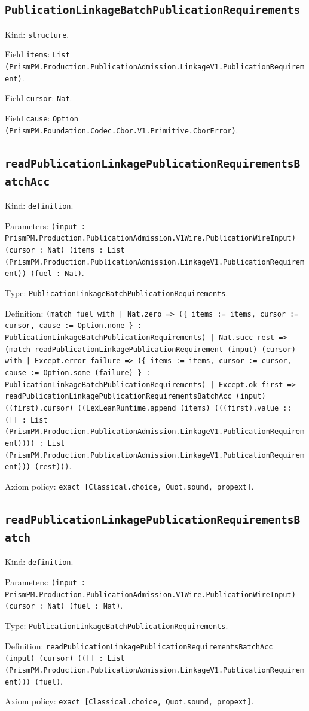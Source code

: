 \documentclass[11pt]{article}
\begin{document}
\subsection*{\texttt{PublicationLinkageBatchPublicationRequirements}}
\noindent Kind: \texttt{structure}.\par
\noindent Field \texttt{items}: \texttt{List (PrismPM.Production.PublicationAdmission.LinkageV1.PublicationRequirement)}.\par
\noindent Field \texttt{cursor}: \texttt{Nat}.\par
\noindent Field \texttt{cause}: \texttt{Option (PrismPM.Foundation.Codec.Cbor.V1.Primitive.CborError)}.\par
\subsection*{\texttt{readPublicationLinkagePublicationRequirementsBatchAcc}}
\noindent Kind: \texttt{definition}.\par
\noindent Parameters: \texttt{(input : PrismPM.Production.PublicationAdmission.V1Wire.PublicationWireInput) (cursor : Nat) (items : List (PrismPM.Production.PublicationAdmission.LinkageV1.PublicationRequirement)) (fuel : Nat)}.\par
\noindent Type: \texttt{PublicationLinkageBatchPublicationRequirements}.\par
\noindent Definition: \texttt{(match fuel with | Nat.zero => (\{ items := items, cursor := cursor, cause := Option.none \} : PublicationLinkageBatchPublicationRequirements) | Nat.succ rest => (match readPublicationLinkagePublicationRequirement (input) (cursor) with | Except.error failure => (\{ items := items, cursor := cursor, cause := Option.some (failure) \} : PublicationLinkageBatchPublicationRequirements) | Except.ok first => readPublicationLinkagePublicationRequirementsBatchAcc (input) ((first).cursor) ((LexLeanRuntime.append (items) (((first).value :: ([] : List (PrismPM.Production.PublicationAdmission.LinkageV1.PublicationRequirement)))) : List (PrismPM.Production.PublicationAdmission.LinkageV1.PublicationRequirement))) (rest)))}.\par
\noindent Axiom policy: \texttt{exact [Classical.choice, Quot.sound, propext]}.\par
\subsection*{\texttt{readPublicationLinkagePublicationRequirementsBatch}}
\noindent Kind: \texttt{definition}.\par
\noindent Parameters: \texttt{(input : PrismPM.Production.PublicationAdmission.V1Wire.PublicationWireInput) (cursor : Nat) (fuel : Nat)}.\par
\noindent Type: \texttt{PublicationLinkageBatchPublicationRequirements}.\par
\noindent Definition: \texttt{readPublicationLinkagePublicationRequirementsBatchAcc (input) (cursor) (([] : List (PrismPM.Production.PublicationAdmission.LinkageV1.PublicationRequirement))) (fuel)}.\par
\noindent Axiom policy: \texttt{exact [Classical.choice, Quot.sound, propext]}.\par
\end{document}
